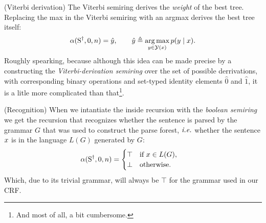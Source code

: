 \begin{example}{(Viterbi derivation)}
  \label{ex:vit-derivation}
  The Viterbi semiring derives the \textit{weight} of the best tree. Replacing the max in the Viterbi semiring with an argmax derives the best tree itself:
  \begin{align*}
    \alpha(\text{S}^{\dagger}, 0, n) = \hat{y}, \qquad \hat{y} \triangleq \operatorname*{arg\,max}_{y \in \mathcal{Y}(x)} p(y \mid x).
  \end{align*}
  Roughly spearking, because although this idea can be made precise by a constructing the \textit{Viterbi-derivation semiring} \citep{goodman1999semiring} over the set of possible derrivations, with corresponding binary operations and set-typed identity elements $\hat{0}$ and $\hat{1}$, it is a litle more complicated than that\footnote{And most of all, a bit cumbersome.}.
\end{example}

\begin{example}{(Recognition)}
  When we intantiate the inside recursion with the \textit{boolean semiring} we get the recursion that recognizes whether the sentence is parsed by the grammar $G$ that was used to construct the parse forest, $\emph{i.e.}$ whether the sentence $x$ is in the language $L(G)$ generated by $G$:
  \begin{align*}
    \alpha(\text{S}^{\dagger}, 0, n) &= \begin{cases}
      \top & \mbox{if } x \in L(G),  \\
      \bot & \mbox{otherwise.}
  \end{cases}
  \end{align*}
  Which, due to its trivial grammar, will always be $\top$ for the grammar used in our CRF.
\end{example}
